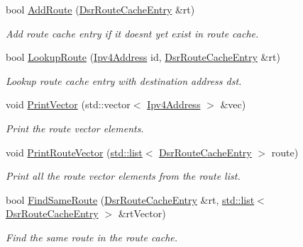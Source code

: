 \begin{DoxyCompactItemize}
bool \hyperlink{classns3_1_1dsr_1_1DsrRouteCache_aff3dfb9a3d25a73e79363e8d6d977003}{Add\+Route} (\hyperlink{classns3_1_1dsr_1_1DsrRouteCacheEntry}{Dsr\+Route\+Cache\+Entry} \&rt)
\begin{DoxyCompactList}\small\item\em Add route cache entry if it doesn\textquotesingle{}t yet exist in route cache. \end{DoxyCompactList}\item 
bool \hyperlink{classns3_1_1dsr_1_1DsrRouteCache_a563d72057fbabedafb85907ea79d692f}{Lookup\+Route} (\hyperlink{classns3_1_1Ipv4Address}{Ipv4\+Address} id, \hyperlink{classns3_1_1dsr_1_1DsrRouteCacheEntry}{Dsr\+Route\+Cache\+Entry} \&rt)
\begin{DoxyCompactList}\small\item\em Lookup route cache entry with destination address dst. \end{DoxyCompactList}\item 
void \hyperlink{classns3_1_1dsr_1_1DsrRouteCache_a9d47644d07a4b6f1ec0c429cdb1bdf37}{Print\+Vector} (std\+::vector$<$ \hyperlink{classns3_1_1Ipv4Address}{Ipv4\+Address} $>$ \&vec)
\begin{DoxyCompactList}\small\item\em Print the route vector elements. \end{DoxyCompactList}\item 
void \hyperlink{classns3_1_1dsr_1_1DsrRouteCache_aa6b0573d528ac382538d387aded36655}{Print\+Route\+Vector} (\hyperlink{openflow-interface_8h_afd9bcfa176617760671b67580f536fa7}{std\+::list}$<$ \hyperlink{classns3_1_1dsr_1_1DsrRouteCacheEntry}{Dsr\+Route\+Cache\+Entry} $>$ route)
\begin{DoxyCompactList}\small\item\em Print all the route vector elements from the route list. \end{DoxyCompactList}\item 
bool \hyperlink{classns3_1_1dsr_1_1DsrRouteCache_a881db5104e9bb9b45e4ec836b0a802da}{Find\+Same\+Route} (\hyperlink{classns3_1_1dsr_1_1DsrRouteCacheEntry}{Dsr\+Route\+Cache\+Entry} \&rt, \hyperlink{openflow-interface_8h_afd9bcfa176617760671b67580f536fa7}{std\+::list}$<$ \hyperlink{classns3_1_1dsr_1_1DsrRouteCacheEntry}{Dsr\+Route\+Cache\+Entry} $>$ \&rt\+Vector)
\begin{DoxyCompactList}\small\item\em Find the same route in the route cache. \end{DoxyCompactList}\item 

\end{DoxyCompactItemize}
